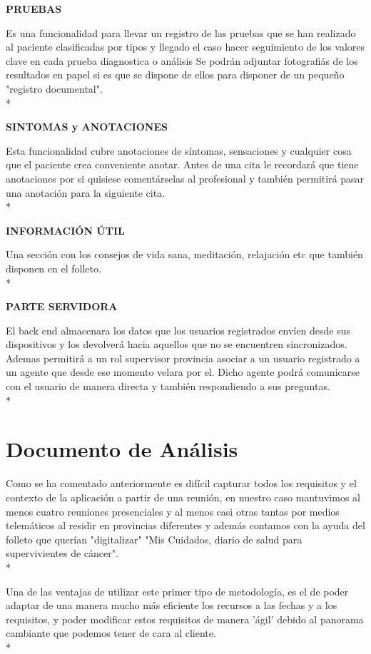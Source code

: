 \documentclass[../pfc.tex]{subfiles}
\begin{document}
	\textbf{PRUEBAS}
	
	Es una funcionalidad para llevar un registro de las pruebas que se han realizado al paciente clasificadas por tipos y llegado el caso hacer seguimiento de los valores clave en cada prueba diagnostica o análisis Se podrán adjuntar fotografiás de los resultados en papel si es que se dispone de ellos para disponer de un pequeño "registro documental".\\*
	
	\textbf{SINTOMAS y ANOTACIONES}
	
	Esta funcionalidad cubre anotaciones de síntomas, sensaciones y cualquier cosa que el paciente crea conveniente anotar. Antes de una cita le recordará que tiene anotaciones por si quisiese comentárselas al profesional y también permitirá pasar una anotación para la siguiente cita.\\*

	\textbf{INFORMACIÓN ÚTIL}
	
	Una sección con los consejos de vida sana, meditación, relajación etc que también disponen en el folleto.\\* 
	
	\textbf{PARTE SERVIDORA}

	El back end almacenara los datos que los usuarios registrados envíen desde sus dispositivos y los devolverá hacia aquellos que no se encuentren sincronizados. Ademas permitirá a un rol supervisor provincia asociar a un usuario registrado a un agente que desde ese momento velara por el. Dicho agente podrá comunicarse con el usuario de manera directa y también respondiendo a sus preguntas.\\*  

	
	\section{Documento de Análisis}

	Como se ha comentado anteriormente es difícil capturar todos los requisitos y el contexto de la aplicación a partir de una reunión, en nuestro caso mantuvimos al menos cuatro reuniones presenciales y al menos casi otras tantas por medios telemáticos al residir en provincias diferentes y además contamos con la ayuda del folleto que querían "digitalizar" "Mis Cuidados, diario de salud para supervivientes de cáncer".\\*
			
	Una de las ventajas de utilizar este primer tipo de metodología, es el de poder adaptar de una manera mucho más eficiente los recursos a las fechas y a los requisitos, y poder modificar estos requisitos de manera 'ágil' debido al panorama cambiante que podemos tener de cara al cliente.\\*
			
\end{document}
